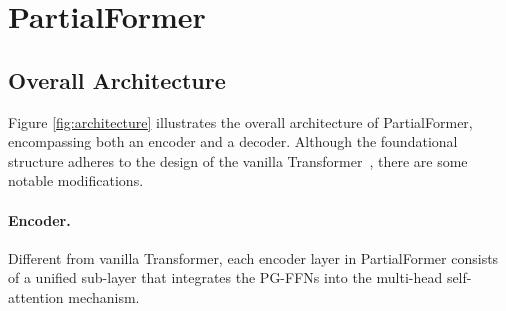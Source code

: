\documentclass[11pt]{article}
\begin{document}
\begin{figure*}[ht!]
    
    
    
    \caption{(a) Architecture of Transformer. (b) Architecture of PartialFormer. (c) Details of Self-AFFN Block. All architecture are based on pre-normalization strategy. We omit the layer normalization operation, residual connection, softmax operation and scale coefficient for simplicity.     }
    \label{fig:architecture}
\end{figure*}
\endgroup 
\section{PartialFormer}
\subsection{Overall Architecture}
Figure \ref{fig:architecture} illustrates the overall architecture of PartialFormer, encompassing both an encoder and a decoder. Although the foundational structure adheres to the design of the vanilla Transformer~\cite{Vaswani2017transformer}, there are some notable modifications.

\paragraph{Encoder.}
Different from vanilla Transformer, each encoder layer in PartialFormer consists of a unified sub-layer that integrates the PG-FFNs into the multi-head self-attention mechanism.
\end{document}
